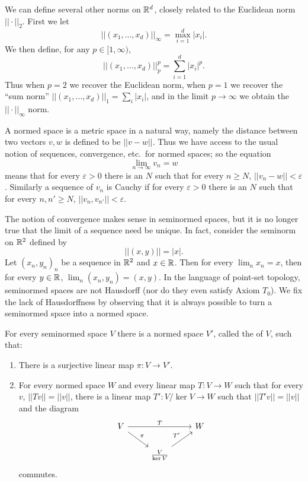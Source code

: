 \begin{example}
We can define several other norms on $\mathbb{R}^{d}$, closely related to the Euclidean norm $||\cdot||_{2}$. First we let
\[||(x_{1}, \dots, x_{d})||_{\infty} = \max_{i=1}^{d} |x_{i}|.\]
We then define, for any $p \in [1, \infty)$,
\[||(x_{1}, \dots, x_{d})||_{p} ^{p} = \sum_{i=1}^{d} |x_{i}|^{p}.\]
Thus when $p = 2$ we recover the Euclidean norm, when $p = 1$ we recover the ``sum norm'' $||(x_{1}, \dots, x_{d})||_{1} = \sum_{i} |x_{i}|$, and in the limit $p \to \infty$ we obtain the $||\cdot||_{\infty}$ norm.
\end{example}

\begin{subsec}
A normed space is a metric space in a natural way, namely the distance between two vectors $v,w$ is defined to be $||v - w||$.
Thus we have access to the usual notion of sequences, convergence, etc.\ for normed spaces; so the equation
\[\lim_{n \to \infty} v_{n} = w\]
means that for every $\varepsilon > 0$ there is an $N$ such that for every $n \geq N$, $||v_{n} - w|| < \varepsilon$.
Similarly a sequence of $v_{n}$ is Cauchy if for every $\varepsilon > 0$ there is an $N$ such that for every $n, n' \geq N$, $||v_{n}, v_{n'}|| < \varepsilon$.
\end{subsec}

\begin{subsec}
The notion of convergence makes sense in seminormed spaces, but it is no longer true that the limit of a sequence need be unique.
In fact, consider the seminorm on $\mathbb{R}^{2}$ defined by
\[||(x, y)|| = |x|.\]
Let ${(x_{n}, y_{n})}_{n}$ be a sequence in $\mathbb{R}^{2}$ and $x \in \mathbb{R}$. Then for every $\lim_{n} x_{n} = x$, then for every $y \in \mathbb{R}$, $\lim_{n} (x_{n}, y_{n}) = (x, y)$.
In the language of point-set topology, seminormed spaces are not Hausdorff (nor do they even satisfy Axiom $T_{0}$).
We fix the lack of Hausdorffness by observing that it is always possible to turn a seminormed space into a normed space.
\end{subsec}

\begin{theorem}\label{existence of normalization}
For every seminormed space $V$ there is a normed space $V'$, called the  of $V$, such that:
\begin{enumerate}
\item There is a surjective linear map $\pi: V \to V'$.
\item For every normed space $W$ and every linear map $T: V \to W$ such that for every $v$, $||Tv|| = ||v||$, there is a linear map $T': V/\ker V \to W$ such that $||T'v|| = ||v||$ and the diagram
\begin{equation}\label{normification universal}
\begin{tikzcd}
V \arrow[rr,"T"] \arrow[dr,"\pi"] && W\\
& \frac{V}{\ker V} \arrow[ur,"T'"]
\end{tikzcd}
\end{equation}
commutes.
\end{enumerate}
\end{theorem}

